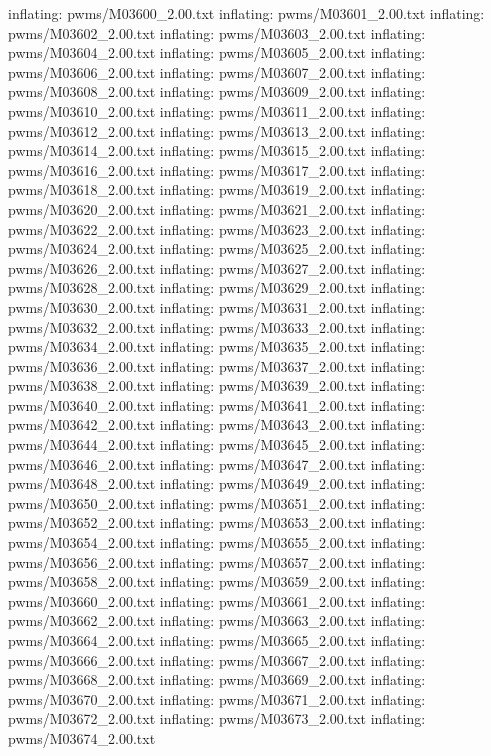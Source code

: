 \documentclass[letterpaper,10pt,english]{sphinxmanual}
\begin{document}
{\begin{sphinxVerbatim}[commandchars=\\\{\}]
  inflating: pwms/M03600\_2.00.txt
  inflating: pwms/M03601\_2.00.txt
  inflating: pwms/M03602\_2.00.txt
  inflating: pwms/M03603\_2.00.txt
  inflating: pwms/M03604\_2.00.txt
  inflating: pwms/M03605\_2.00.txt
  inflating: pwms/M03606\_2.00.txt
  inflating: pwms/M03607\_2.00.txt
  inflating: pwms/M03608\_2.00.txt
  inflating: pwms/M03609\_2.00.txt
  inflating: pwms/M03610\_2.00.txt
  inflating: pwms/M03611\_2.00.txt
  inflating: pwms/M03612\_2.00.txt
  inflating: pwms/M03613\_2.00.txt
  inflating: pwms/M03614\_2.00.txt
  inflating: pwms/M03615\_2.00.txt
  inflating: pwms/M03616\_2.00.txt
  inflating: pwms/M03617\_2.00.txt
  inflating: pwms/M03618\_2.00.txt
  inflating: pwms/M03619\_2.00.txt
  inflating: pwms/M03620\_2.00.txt
  inflating: pwms/M03621\_2.00.txt
  inflating: pwms/M03622\_2.00.txt
  inflating: pwms/M03623\_2.00.txt
  inflating: pwms/M03624\_2.00.txt
  inflating: pwms/M03625\_2.00.txt
  inflating: pwms/M03626\_2.00.txt
  inflating: pwms/M03627\_2.00.txt
  inflating: pwms/M03628\_2.00.txt
  inflating: pwms/M03629\_2.00.txt
  inflating: pwms/M03630\_2.00.txt
  inflating: pwms/M03631\_2.00.txt
  inflating: pwms/M03632\_2.00.txt
  inflating: pwms/M03633\_2.00.txt
  inflating: pwms/M03634\_2.00.txt
  inflating: pwms/M03635\_2.00.txt
  inflating: pwms/M03636\_2.00.txt
  inflating: pwms/M03637\_2.00.txt
  inflating: pwms/M03638\_2.00.txt
  inflating: pwms/M03639\_2.00.txt
  inflating: pwms/M03640\_2.00.txt
  inflating: pwms/M03641\_2.00.txt
  inflating: pwms/M03642\_2.00.txt
  inflating: pwms/M03643\_2.00.txt
  inflating: pwms/M03644\_2.00.txt
  inflating: pwms/M03645\_2.00.txt
  inflating: pwms/M03646\_2.00.txt
  inflating: pwms/M03647\_2.00.txt
  inflating: pwms/M03648\_2.00.txt
  inflating: pwms/M03649\_2.00.txt
  inflating: pwms/M03650\_2.00.txt
  inflating: pwms/M03651\_2.00.txt
  inflating: pwms/M03652\_2.00.txt
  inflating: pwms/M03653\_2.00.txt
  inflating: pwms/M03654\_2.00.txt
  inflating: pwms/M03655\_2.00.txt
  inflating: pwms/M03656\_2.00.txt
  inflating: pwms/M03657\_2.00.txt
  inflating: pwms/M03658\_2.00.txt
  inflating: pwms/M03659\_2.00.txt
  inflating: pwms/M03660\_2.00.txt
  inflating: pwms/M03661\_2.00.txt
  inflating: pwms/M03662\_2.00.txt
  inflating: pwms/M03663\_2.00.txt
  inflating: pwms/M03664\_2.00.txt
  inflating: pwms/M03665\_2.00.txt
  inflating: pwms/M03666\_2.00.txt
  inflating: pwms/M03667\_2.00.txt
  inflating: pwms/M03668\_2.00.txt
  inflating: pwms/M03669\_2.00.txt
  inflating: pwms/M03670\_2.00.txt
  inflating: pwms/M03671\_2.00.txt
  inflating: pwms/M03672\_2.00.txt
  inflating: pwms/M03673\_2.00.txt
  inflating: pwms/M03674\_2.00.txt

\end{sphinxVerbatim}}
\end{document}
